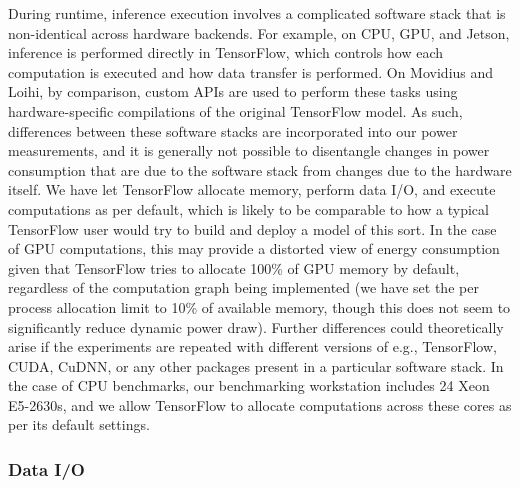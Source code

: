 \documentclass{article}
\begin{document}
During runtime, inference execution involves a complicated software stack that is non-identical across hardware backends. For example, on CPU, GPU, and Jetson, inference is performed directly in TensorFlow, which controls how each computation is executed and how data transfer is performed. On Movidius and Loihi, by comparison, custom APIs are used to perform these tasks using hardware-specific compilations of the original TensorFlow model. As such, differences between these software stacks are incorporated into our power measurements, and it is generally not possible to disentangle changes in power consumption that are due to the software stack from changes due to the hardware itself. We have let TensorFlow allocate memory, perform data I/O, and execute computations as per default, which is likely to be comparable to how a typical TensorFlow user would try to build and deploy a model of this sort. In the case of GPU computations, this may provide a distorted view of energy consumption given that TensorFlow tries to allocate 100\% of GPU memory by default, regardless of the computation graph being implemented (we have set the per process allocation limit to 10\% of available memory, though this does not seem to significantly reduce dynamic power draw). Further differences could theoretically arise if the experiments are repeated with different versions of e.g., TensorFlow, CUDA, CuDNN, or any other packages present in a particular software stack. In the case of CPU benchmarks, our benchmarking workstation includes 24 Xeon E5-2630s, and we allow TensorFlow to allocate computations across these cores as per its default settings. 


\subsubsection{Data I/O}
\end{document}
